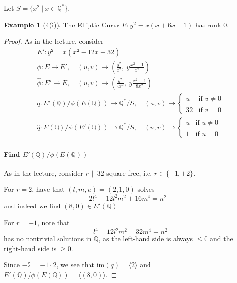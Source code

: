 \documentclass{scrartcl}
\newcommand{\Q}{\mathbb{Q}}
\newcommand{\im}{\mathrm{im}}
\newcommand{\divides}{\ \mid \ }
\theoremstyle{definition}
\newtheorem{example}[subsection]{Example}
\begin{document}
Let $S = \{ x^2 \ | \ x \in \Q^* \}$.
\begin{example}[4(i)]
    \label{ex:4i}
    The Elliptic Curve $E: y^2 = x(x + 6x + 1)$ has rank $0$.
\end{example}
\begin{proof}
    As in the lecture, consider
    \begin{align*}
        &E': y^2 = x(x^2 - 12x + 32) \\
        &\phi: E \to E', \quad (u, v) \mapsto \left( \frac {y^2} {x^2}, \ y \frac {x^2 - 1} {x^2} \right) \\
        &\hat{\phi}: E' \to E, \quad (u, v) \mapsto \left( \frac {y^2} {4x^2}, \ y \frac {x^2 - 1} {8x^2} \right) \\
        &q: E'(\Q)/\phi(E(\Q)) \to \Q^*/S, \quad \overline{(u, v)} \mapsto \begin{cases}
            \overline{u} & \text{if $u \neq 0$} \\
            \overline{32} & \text{if $u = 0$}
        \end{cases} \\
        &\hat{q}: E(\Q)/\phi(E'(\Q)) \to \Q^*/S, \quad \overline{(u, v)} \mapsto \begin{cases}
            \overline{u} & \text{if $u \neq 0$} \\
            \overline{1} & \text{if $u = 0$}
        \end{cases}
    \end{align*}
    \paragraph{Find $E'(\Q)/\phi(E(\Q))$} As in the lecture, consider $r \divides 32$ square-free, i.e. $r \in \{ \pm 1, \pm 2 \}$.

    For $r = 2$, have that $(l, m, n) = (2, 1, 0)$ solves
    \begin{equation*}
        2l^4 - 12l^2m^2 + 16m^4 = n^2
    \end{equation*}
    and indeed we find $(8, 0) \in E'(\Q)$.

    For $r = -1$, note that
    \begin{equation*}
        -l^4 - 12l^2m^2 - 32m^4 = n^2
    \end{equation*}
    has no nontrivial solutions in $\Q$, as the left-hand side is always $\leq 0$ and the right-hand side is $\geq 0$.

    Since $-2 = -1 \cdot 2$, we see that $\im(q) = \langle 2 \rangle$ and $E'(\Q)/\phi(E(\Q)) = \langle (8, 0) \rangle$.


\end{proof}
\end{document}

